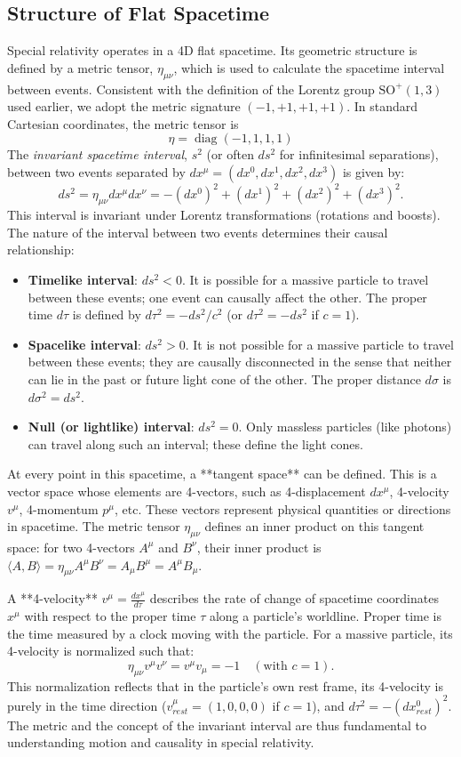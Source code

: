 \documentclass{amsart}
\theoremstyle{definition}
\theoremstyle{remark}
\DeclareMathOperator{\diag}{diag}
\begin{document}
\subsection{Structure of Flat Spacetime}
\label{subsec:sr_structure}
Special relativity operates in a 4D flat spacetime. Its geometric structure is defined by a metric tensor, $\eta_{\mu\nu}$, which is used to calculate the spacetime interval between events. Consistent with the definition of the Lorentz group $\mathrm{SO}^+(1,3)$ used earlier, we adopt the metric signature $(-1, +1, +1, +1)$. In standard Cartesian coordinates, the metric tensor is
\[
\eta=\diag(-1,1,1,1)
\]
The \emph{invariant spacetime interval}, $s^2$ (or often $ds^2$ for infinitesimal separations), between two events separated by $dx^\mu = (dx^0, dx^1, dx^2, dx^3)$ is given by:
\[
ds^2 = \eta_{\mu\nu} dx^\mu dx^\nu = -(dx^0)^2 + (dx^1)^2 + (dx^2)^2 + (dx^3)^2.
\]
This interval is invariant under Lorentz transformations (rotations and boosts). The nature of the interval between two events determines their causal relationship:
\begin{itemize}
    \item \textbf{Timelike interval}: $ds^2 < 0$. It is possible for a massive particle to travel between these events; one event can causally affect the other. The proper time $d\tau$ is defined by $d\tau^2 = -ds^2/c^2$ (or $d\tau^2 = -ds^2$ if $c=1$).
    \item \textbf{Spacelike interval}: $ds^2 > 0$. It is not possible for a massive particle to travel between these events; they are causally disconnected in the sense that neither can lie in the past or future light cone of the other. The proper distance $d\sigma$ is $d\sigma^2 = ds^2$.
    \item \textbf{Null (or lightlike) interval}: $ds^2 = 0$. Only massless particles (like photons) can travel along such an interval; these define the light cones.
\end{itemize}

At every point in this spacetime, a **tangent space** can be defined. This is a vector space whose elements are 4-vectors, such as 4-displacement $dx^\mu$, 4-velocity $v^\mu$, 4-momentum $p^\mu$, etc. These vectors represent physical quantities or directions in spacetime. The metric tensor $\eta_{\mu\nu}$ defines an inner product on this tangent space: for two 4-vectors $A^\mu$ and $B^\nu$, their inner product is $\langle A, B \rangle = \eta_{\mu\nu} A^\mu B^\nu = A_\mu B^\mu = A^\mu B_\mu$.

A **4-velocity** $v^\mu = \frac{dx^\mu}{d\tau}$ describes the rate of change of spacetime coordinates $x^\mu$ with respect to the proper time $\tau$ along a particle's worldline. Proper time is the time measured by a clock moving with the particle. For a massive particle, its 4-velocity is normalized such that:
\[
\eta_{\mu\nu} v^\mu v^\nu = v^\mu v_\mu = -1 \quad (\text{with } c=1).
\]
This normalization reflects that in the particle's own rest frame, its 4-velocity is purely in the time direction ($v^\mu_{rest} = (1,0,0,0)$ if $c=1$), and $d\tau^2 = -(dx^0_{rest})^2$. The metric and the concept of the invariant interval are thus fundamental to understanding motion and causality in special relativity.
\end{document}
